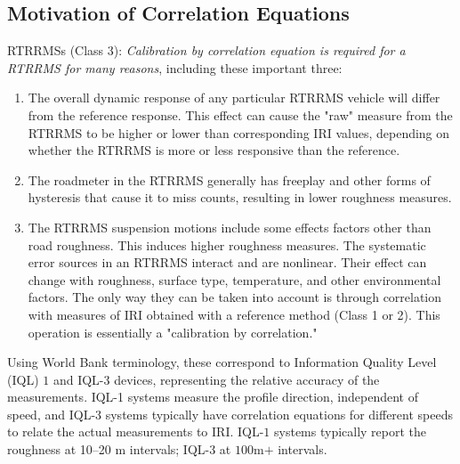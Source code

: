 \documentclass{standalone}
\begin{document}
\subsection{Motivation of Correlation Equations}
RTRRMSs (Class 3): \cite{little_book} \textit{Calibration by correlation equation is required for a RTRRMS for many reasons}, including these important three:
\begin{enumerate}
\item The overall dynamic response of any particular RTRRMS vehicle will differ from the reference response. This effect can cause the "raw" measure from the RTRRMS to be higher or lower than corresponding IRI values, depending on whether the RTRRMS is more or less responsive than the reference.

\item The roadmeter in the RTRRMS generally has freeplay and other forms of hysteresis that cause it to miss counts, resulting in lower roughness measures.

\item The RTRRMS suspension motions include some effects factors other than road roughness. This induces higher roughness measures. The systematic error sources in an RTRRMS interact and are nonlinear. Their effect can change with roughness, surface type, temperature, and other environmental factors. The only way they can be taken into account is through correlation with measures of IRI obtained with a reference method (Class 1 or 2). This operation is essentially a "calibration by correlation."

\end{enumerate}
\noindent Using World Bank terminology, these correspond to Information Quality Level (IQL) $1$ and IQL-$3$ devices, representing the relative accuracy of the measurements\cite{bennett2006data}. IQL-1 systems measure the profile direction, independent of speed, and IQL-3 systems typically have correlation equations for different speeds to relate the actual measurements to IRI.
IQL-$1$ systems typically report the roughness at \numrange{10}{20} \si{\meter} intervals; IQL-3 at $100$\si{\meter}$+$ intervals.
\end{document}
